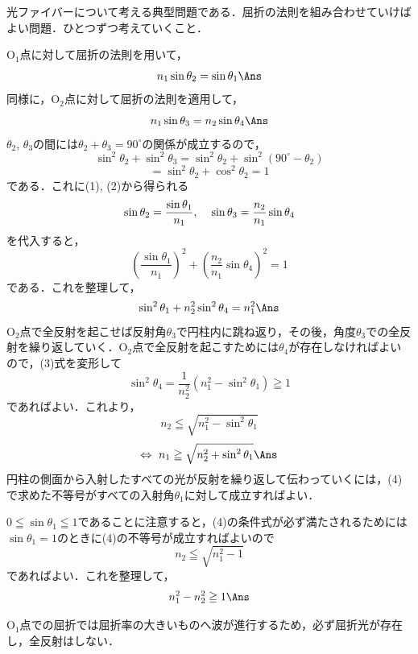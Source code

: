 \par\nopagebreak
\begin{sisin}
光ファイバーについて考える典型問題である．屈折の法則を組み合わせていけばよい問題．ひとつずつ考えていくこと．
\end{sisin}
\KaiHead
\begin{komon}
 $\mathrm{O_1}$点に対して屈折の法則を用いて，
       \[n_1\sin\theta_2=\sin\theta_1\Ans\]
 同様に，$\mathrm{O_2}$点に対して屈折の法則を適用して，
       \[n_1\sin\theta_3=n_2\sin\theta_4\Ans\]
 $\theta_2$, $\theta_3$の間には$\theta_2+\theta_3=90^\circ$の関係が成立するので，
       \[\sin^2\theta_2+\sin^2\theta_3=\sin^2\theta_2+\sin^2(90^\circ-\theta_2)\]
       \[=\sin^2\theta_2+\cos^2\theta_2=1\]
       である．これに(1), (2)から得られる
       \[\sin\theta_2=\frac{\sin\theta_1}{n_1},\hspace{4mm}\sin\theta_3=\frac{n_2}{n_1}\sin\theta_4\]
       を代入すると，
       \[\left(\frac{\sin\theta_1}{n_1}\right)^2+\left(\frac{n_2}{n_1}\sin\theta_4\right)^2=1\]
       である．これを整理して，
       \[\sin^2\theta_1+n_2^2\sin^2\theta_4=n_1^2\Ans\]
 $\mathrm{O_2}$点で全反射を起こせば反射角$\theta_3$で円柱内に跳ね返り，その後，角度$\theta_3$での全反射を繰り返していく．$\mathrm{O_2}$点で全反射を起こすためには$\theta_4$が存在しなければよいので，(3)式を変形して
       \[\sin^2\theta_4=\frac{1}{n_2^2}\left(n_1^2-\sin^2\theta_1\right)\geqq 1\]
       であればよい．これより，
       \[n_2\leqq\sqrt{n_1^2-\sin^2\theta_1}\]
       \[\Leftrightarrow\ n_1\geqq\sqrt{n_2^2+\sin^2\theta_1}\Ans\]
 円柱の側面から入射したすべての光が反射を繰り返して伝わっていくには，(4)で求めた不等号がすべての入射角$\theta_1$に対して成立すればよい．

       $0\leqq\sin\theta_1\leqq 1$であることに注意すると，(4)の条件式が必ず満たされるためには$\sin\theta_1=1$のときに(4)の不等号が成立すればよいので
       \[n_2\leqq\sqrt{n_1^2-1}\]
       であればよい．これを整理して，
       \[n_1^2-n_2^2\geqq 1\Ans\]
\end{komon}
\begin{chuu}
$\mathrm{O_1}$点での屈折では屈折率の大きいものへ波が進行するため，必ず屈折光が存在し，全反射はしない．
\end{chuu}
